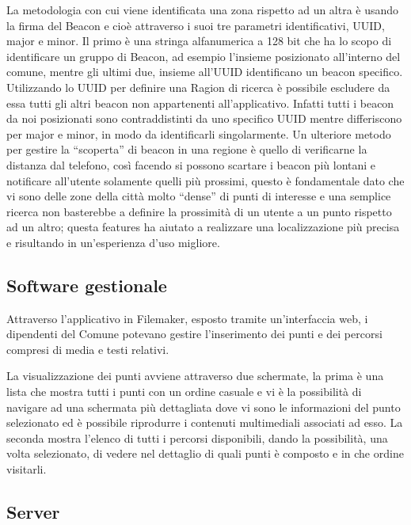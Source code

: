 La metodologia con cui viene identificata una zona rispetto ad un altra è usando la firma del Beacon e cioè attraverso i suoi tre parametri identificativi, UUID, major e minor. Il primo è una stringa alfanumerica a 128 bit che ha lo scopo di identificare un gruppo di Beacon, ad esempio l’insieme posizionato all’interno del comune, mentre gli ultimi due, insieme all’UUID identificano un beacon specifico. Utilizzando lo UUID per definire una Ragion di ricerca è possibile escludere da essa tutti gli altri beacon non appartenenti all’applicativo. Infatti tutti i beacon da noi posizionati sono contraddistinti da uno specifico UUID mentre differiscono per major e minor, in modo da identificarli singolarmente. Un ulteriore metodo per gestire la “scoperta” di beacon in una regione è quello di verificarne la distanza dal telefono, così facendo si possono scartare i beacon più lontani e notificare all’utente solamente quelli più prossimi, questo è fondamentale dato che vi sono delle zone della città molto “dense” di punti di interesse e una semplice ricerca non basterebbe a definire la prossimità di un utente a un punto rispetto ad un altro; questa features ha aiutato a realizzare una localizzazione più precisa e risultando in un’esperienza d’uso migliore.\vspace{5mm}

\subsection{Software gestionale}\vspace{5mm}

	Attraverso l’applicativo in Filemaker, esposto tramite un’interfaccia web, i dipendenti del Comune potevano gestire l’inserimento dei punti e dei percorsi compresi di media e testi relativi. \vspace{5mm}
	
La visualizzazione dei punti avviene attraverso due schermate, la prima è una lista che mostra tutti i punti con un ordine casuale e vi è la possibilità di navigare ad una schermata più dettagliata dove vi sono le informazioni del punto selezionato ed è possibile riprodurre i contenuti multimediali associati ad esso. La seconda mostra l'elenco di tutti i percorsi disponibili, dando la possibilità, una volta selezionato, di vedere nel dettaglio di quali punti è composto e in che ordine visitarli.\vspace{5mm}

\subsection{Server}\vspace{5mm}
	
